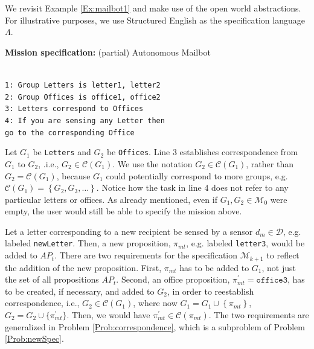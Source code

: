 \begin{myExample}\label{Ex:mailbot2}We revisit Example \ref{Ex:mailbot1} and make use of the open world abstractions. For illustrative purposes, we use Structured English \cite{JFRKGICRA12} as the specification language $\Lambda$.
\begin{algorithm}
\textbf{Mission specification:} (partial) Autonomous Mailbot
	
	\vspace{-6 pt}
	\hrulefill\\
	{\small
\texttt{1: Group Letters is letter1, letter2} \\
\texttt{2: Group Offices is office1, office2} \\
\texttt{3: Letters correspond to Offices} \\
\texttt{4: If you are sensing any Letter then}\\
\texttt{go to the corresponding Office}\\ 
}
\vspace{-10 pt}
\end{algorithm}

Let $G_1$ be \texttt{Letters} and $G_2$ be \texttt{Offices}. Line 3 establishes correspondence from $G_1$ to $G_2$, .i.e., $G_2 \in \mathcal{C}(G_1)$. We use the notation $G_2 \in \mathcal{C}(G_1)$, rather than $G_2 = \mathcal{C}(G_1)$, because $G_1$ could potentially correspond to more groups, e.g. $\mathcal{C}(G_1) = \left\{ G_2, G_3, \ldots\right\}$. 
Notice how the task in line 4 does not refer to any particular letters or offices. 
As already mentioned, even if $G_1, G_2 \in \mathcal{M}_0$ were empty, the user would still be able to specify the mission above.
\end{myExample}

Let a letter corresponding to a new recipient be sensed by a sensor $d_{m} \in \mathcal{D}$, e.g. labeled \texttt{newLetter}. Then, a new proposition, $\pi_{mt}$, e.g. labeled \texttt{letter3}, would be added to $AP_t$. 
There are two requirements for the specification $\mathcal{M}_{k+1}$ to reflect the addition of the new proposition. 
First, $\pi_{mt}$ has to be added to $G_1$, not just the set of all propositions $AP_t$. 
Second, an office proposition, $\pi_{mt}^\prime = \texttt{office3}$, has to be created, if necessary, and added to $G_2$, in order to reestablish correspondence, i.e., $G_2 \in \mathcal{C}(G_1)$, where now $G_{1} = G_1 \cup \left\{ \pi_{mt} \right\}$, $G_{2} = G_2 \cup \{ \pi_{mt}^\prime \}$. 
Then, we would have $\pi_{mt}^\prime \in \mathcal{C}(\pi_{mt})$. 
The two requirements are generalized in Problem \ref{Prob:correspondence}, which is a subproblem of Problem \ref{Prob:newSpec}.

